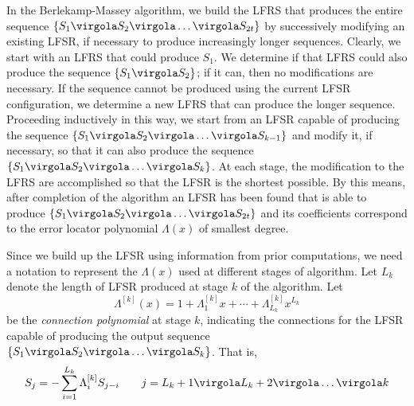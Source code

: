 In the Berlekamp-Massey algorithm, we build the LFRS that produces the entire sequence \( \{S_1\virgola S_2\virgola \ldots \virgola S_{2t} \}\) by successively modifying an existing LFSR, if necessary to produce increasingly longer sequences. Clearly, we start with an LFRS that could produce \(S_1\). We determine if that LFRS could also produce the sequence \( \{S_1\virgola S_2\}\); if it can, then no modifications are necessary. If the sequence cannot be produced using the current LFSR configuration, we determine a new LFRS that can produce the longer sequence. Proceeding inductively in this way, we start from an LFSR capable of producing the sequence \( \{S_1\virgola S_2\virgola \ldots \virgola S_{k-1} \}\) and modify it, if necessary, so that it can also produce the sequence \( \{S_1\virgola S_2\virgola \ldots \virgola S_{k} \}\). At each stage, the modification to the LFRS are accomplished so that the LFSR is the shortest possible. By this means, after completion of the algorithm an LFSR has been found that is able to produce \( \{S_1\virgola S_2\virgola \ldots \virgola S_{2t} \}\) and its coefficients correspond to the error locator polynomial \(\Lambda(x)\) of smallest degree.

Since we build up the LFSR using information from prior computations, we need a notation to represent the \(\Lambda(x)\) used at different stages of algorithm. Let \(L_k\) denote the length of LFSR produced at stage \(k\) of the algorithm. Let
\begin{equation}
\Lambda^{[k]}(x) = 1 + \Lambda_1^{[k]}x + \cdots + \Lambda_{L_k}^{[k]}x^{L_k}
\end{equation}
be the \emph{connection polynomial} at stage \(k\), indicating the connections for the LFSR capable of producing the output sequence \(\{S_1\virgola S_2\virgola \ldots \virgola S_{k} \}\). That is,
\begin{equation}
S_j = - \sum_{i = 1}^{L_k} {\Lambda_i^{[k]} S_{j-i}} \qquad j = L_k+1 \virgola L_k + 2 \virgola \ldots \virgola k
\end{equation}

